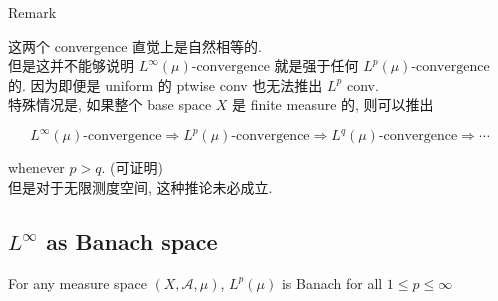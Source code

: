 \begin{qlremark}{Remark}

这两个 convergence 直觉上是自然相等的.\\
但是这并不能够说明 \(L^{\infty}(\mu)\text{-convergence}\) 就是强于任何 \(L^{p}(\mu)\text{-convergence}\) 的. 因为即便是 uniform 的 ptwise conv 也无法推出 \(L^{p}\) conv.\\
特殊情况是, 如果整个 base space \(X\) 是 finite measure 的, 则可以推出

\[L^{\infty}(\mu)\text{-convergence}\Longrightarrow L^{p}(\mu)\text{-convergence}\Longrightarrow L^{q}(\mu)\text{-convergence}\Longrightarrow\cdots\]

whenever \(p > q\). (可证明)\\
但是对于无限测度空间, 这种推论未必成立.

\end{qlremark}

\subsection{\texorpdfstring{\(L^{\infty}\) as Banach space}{L\^{}\{\textbackslash infty\} as Banach space}}\label{linfty-as-banach-space}

\begin{theorem}{}

For any measure space \((X,\mathcal{A},\mu)\), \(L^{p}(\mu)\) is Banach for all \(1 \leq p \leq \infty\)

\end{theorem}

